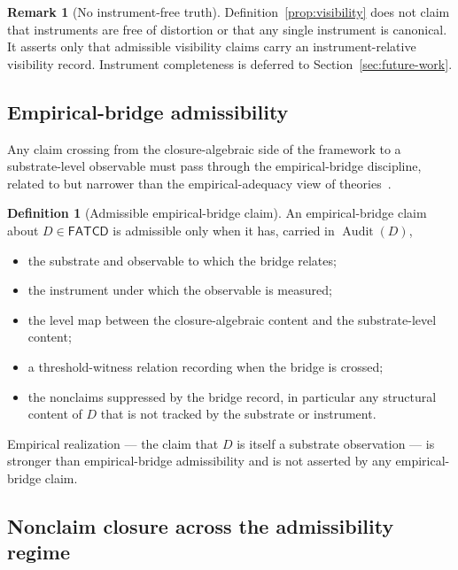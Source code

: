 \documentclass[11pt]{article}
\theoremstyle{definition}
\newtheorem{definition}[theorem]{Definition}
\newtheorem{remark}[theorem]{Remark}
\newcommand{\FATCD}{\ensuremath{\mathsf{FATCD}}}
\newcommand{\Audit}[1]{\ensuremath{\operatorname{Audit}\!\left(#1\right)}}
\begin{document}
\begin{remark}[No instrument-free truth]\label{rem:no-instrument-free}
Definition~\ref{prop:visibility} does not claim that instruments are
free of distortion or that any single instrument is canonical. It asserts only that admissible visibility claims carry an instrument-relative
visibility record. Instrument completeness is deferred to
Section~\ref{sec:future-work}.
\end{remark}

\subsection{Empirical-bridge admissibility}\label{subsec:empirical-bridge}

Any claim crossing from the closure-algebraic side of the framework
to a substrate-level observable must pass through the
empirical-bridge discipline, related to but narrower than
the empirical-adequacy view of theories~\citep{vanFraassen1980}.

\begin{definition}[Admissible empirical-bridge claim]\label{prop:empirical-bridge}
An empirical-bridge claim about \(D \in \FATCD{}\) is admissible only when
it has, carried in \(\Audit{D}\),
\begin{itemize}[topsep=2pt,itemsep=1pt]
  \item the substrate and observable to which the bridge relates;
  \item the instrument under which the observable is measured;
  \item the level map between the closure-algebraic content and the
    substrate-level content;
  \item a threshold-witness relation recording when the bridge is
    crossed;
  \item the nonclaims suppressed by the bridge record, in particular any
    structural content of \(D\) that is not tracked by the substrate or
    instrument.
\end{itemize}
Empirical realization --- the claim that \(D\) is itself a substrate
observation --- is stronger than empirical-bridge admissibility and is
not asserted by any empirical-bridge claim.
\end{definition}


\subsection{Nonclaim closure across the admissibility regime}\label{subsec:nonclaim-closure}
\end{document}
